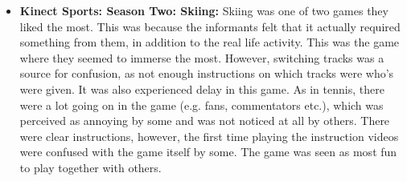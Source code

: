 \begin{itemize}
\item \textbf{Kinect Sports: Season Two: Skiing:} Skiing was one of two games they liked the most. This was because the informants felt that it actually required something from them, in addition to the real life activity. This was the game where they seemed to immerse the most. However, switching tracks was a source for confusion, as not enough instructions on which tracks were who's were given. It was also experienced delay in this game. As in tennis, there were a lot going on in the game (e.g. fans, commentators etc.), which was perceived as annoying by some and was not noticed at all by others. There were clear instructions, however, the first time playing the instruction videos were confused with the game itself by some. The game was seen as most fun to play together with others. 
\end{itemize}

